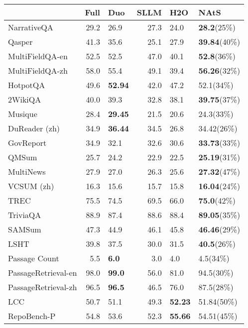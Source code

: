 \begin{tabular}{lrlrll}
\toprule
 & Full & Duo & SLLM & H2O & NAtS \\
\midrule
NarrativeQA & 29.2 & 26.9 & 27.3 & 24.0 & \textbf{28.2}(25\%) \\
Qasper & 41.3 & 35.6 & 25.1 & 27.9 & \textbf{39.84}(40\%) \\
MultiFieldQA-en & 52.5 & 52.5 & 47.0 & 40.1 & \textbf{52.8}(36\%) \\
MultiFieldQA-zh & 58.0 & 55.4 & 49.1 & 39.4 & \textbf{56.26}(32\%) \\
HotpotQA & 49.6 & \textbf{52.94} & 42.0 & 47.2 & 52.1(34\%) \\
2WikiQA & 40.0 & 39.3 & 32.8 & 38.1 & \textbf{39.75}(37\%) \\
Musique & 28.4 & \textbf{29.45} & 21.5 & 20.6 & 24.3(33\%) \\
DuReader (zh) & 34.9 & \textbf{36.44} & 34.5 & 26.8 & 34.42(26\%) \\
GovReport & 34.9 & 32.1 & 32.6 & 30.6 & \textbf{33.73}(33\%) \\
QMSum & 25.7 & 24.2 & 22.9 & 22.5 & \textbf{25.19}(31\%) \\
MultiNews & 27.9 & 27.0 & 26.3 & 25.6 & \textbf{27.32}(47\%) \\
VCSUM (zh) & 16.3 & 15.6 & 15.7 & 15.8 & \textbf{16.04}(24\%) \\
TREC & 75.5 & 74.5 & 69.5 & 66.0 & \textbf{75.0}(42\%) \\
TriviaQA & 88.9 & 87.4 & 88.6 & 88.4 & \textbf{89.05}(35\%) \\
SAMSum & 47.3 & 44.9 & 46.1 & 45.8 & \textbf{46.46}(29\%) \\
LSHT & 39.8 & 37.5 & 30.0 & 31.5 & \textbf{40.5}(26\%) \\
Passage Count & 5.5 & \textbf{6.0} & 3.0 & 4.0 & 4.5(34\%) \\
PassageRetrieval-en & 98.0 & \textbf{99.0} & 56.0 & 81.0 & 94.5(30\%) \\
PassageRetrieval-zh & 96.5 & \textbf{96.5} & 46.5 & 76.0 & 87.5(28\%) \\
LCC & 50.7 & 51.1 & 49.3 & \textbf{52.23} & 51.84(50\%) \\
RepoBench-P & 54.8 & 53.6 & 52.3 & \textbf{55.66} & 54.51(45\%) \\
\bottomrule
\end{tabular}
